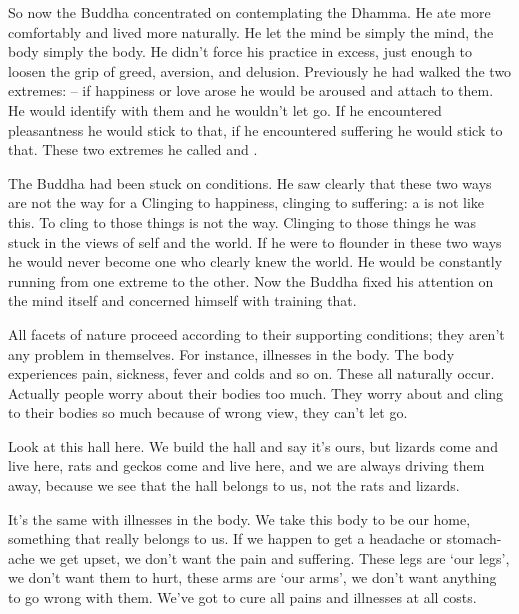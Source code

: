 So now the Buddha concentrated on contemplating the Dhamma. He ate more comfortably and lived more naturally. He let the mind be simply the mind, the body simply the body. He didn't force his practice in excess, just enough to loosen the grip of greed, aversion, and delusion. Previously he had walked the two extremes:  -- if happiness or love arose he would be aroused and attach to them. He would identify with them and he wouldn't let go. If he encountered pleasantness he would stick to that, if he encountered suffering he would stick to that. These two extremes he called  and .

The Buddha had been stuck on conditions. He saw clearly that these two ways are not the way for a  Clinging to happiness, clinging to suffering: a  is not like this. To cling to those things is not the way. Clinging to those things he was stuck in the views of self and the world. If he were to flounder in these two ways he would never become one who clearly knew the world. He would be constantly running from one extreme to the other. Now the Buddha fixed his attention on the mind itself and concerned himself with training that.

All facets of nature proceed according to their supporting conditions; they aren't any problem in themselves. For instance, illnesses in the body. The body experiences pain, sickness, fever and colds and so on. These all naturally occur. Actually people worry about their bodies too much. They worry about and cling to their bodies so much because of wrong view, they can't let go.

Look at this hall here. We build the hall and say it's ours, but lizards come and live here, rats and geckos come and live here, and we are always driving them away, because we see that the hall belongs to us, not the rats and lizards.

It's the same with illnesses in the body. We take this body to be our home, something that really belongs to us. If we happen to get a headache or stomach-ache we get upset, we don't want the pain and suffering. These legs are `our legs', we don't want them to hurt, these arms are `our arms', we don't want anything to go wrong with them. We've got to cure all pains and illnesses at all costs.

